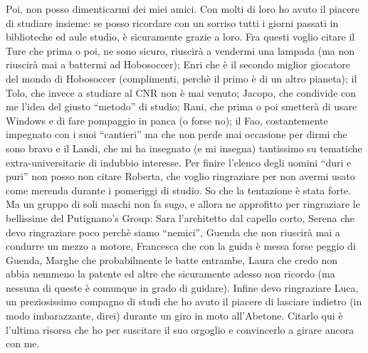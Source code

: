 Poi, non posso dimenticarmi dei miei amici. Con molti di loro ho avuto
il piacere di studiare insieme: se posso ricordare con un sorriso tutti
i giorni passati in biblioteche ed aule studio, \`e sicuramente grazie a
loro. Fra questi voglio citare il Ture che prima o poi, ne sono sicuro,
riuscir\`a a vendermi una lampada (ma non riuscir\`a mai a battermi ad Hobosoccer);
Enri che \`e il secondo miglior giocatore del mondo di Hobosoccer (complimenti, 
perch\`e il primo \`e di un altro pianeta);
il Tolo, che invece a studiare al CNR non \`e mai venuto; Jacopo, che
condivide con me l'idea del giusto ``metodo'' di studio; Rani, che prima
o poi smetter\`a di usare Windows e di fare pompaggio in panca (o forse no); 
il Fao, costantemente impegnato con
i suoi ``cantieri'' ma che non perde mai occasione per dirmi che sono bravo 
e il Landi, che mi ha insegnato (e mi insegna) tantissimo su tematiche 
extra-universitarie di indubbio interesse.
Per finire l'elenco degli uomini ``duri e puri'' non posso non citare Roberta, che voglio
ringraziare per non avermi usato come merenda durante i pomeriggi di studio.
So che la tentazione \`e stata forte.
Ma un gruppo di soli maschi non fa sugo, e allora ne approfitto per ringraziare
le bellissime del Putignano's Group: Sara l'architetto dal capello corto, 
Serena che devo ringraziare poco perch\`e siamo ``nemici'', Guenda che non riuscir\`a
mai a condurre un mezzo a motore, Francesca che con la guida \`e
messa forse peggio di Guenda, Marghe che probabilmente le batte entrambe, Laura 
che credo non abbia nemmeno la patente ed altre che sicuramente adesso
non ricordo (ma nessuna di queste \`e comunque in grado di guidare).
Infine devo ringraziare Luca, un preziosissimo compagno di studi che ho avuto
il piacere di lasciare indietro (in modo imbarazzante, direi) durante un giro
in moto all'Abetone. Citarlo qui \`e l'ultima risorsa che ho per suscitare il
suo orgoglio e convincerlo a girare ancora con me.
